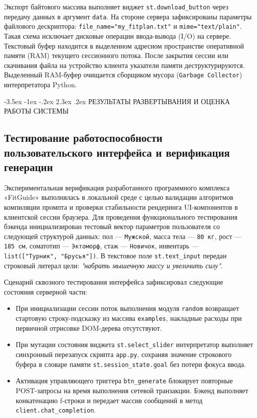 \documentclass[14pt, a4paper]{extarticle}
\makeatletter
\renewcommand\section{\@startsection {section}{1}{\z@}%
                                   {-3.5ex \@plus -1ex \@minus -.2ex}%
                                   {2.3ex \@plus.2ex}%
                                   {\centering\normalfont\Large\bfseries}}
\makeatother
\begin{document}
Экспорт байтового массива выполняет виджет \verb|st.download_button| через передачу данных в аргумент \verb|data|. На стороне сервера зафиксированы параметры файлового дескриптора: \verb|file_name="my_fitplan.txt"| и \verb|mime="text/plain"|. Такая схема исключает дисковые операции ввода-вывода (I/O) на сервере. Текстовый буфер находится в выделенном адресном пространстве оперативной памяти (RAM) \cite{memory_management} текущего сессионного потока. После закрытия сессии или скачивания файла на устройство клиента указатели памяти деструктурируются. Выделенный RAM-буфер очищается сборщиком мусора (\texttt{Garbage Collector}) интерпретатора Python.



\newpage
\section{РЕЗУЛЬТАТЫ РАЗВЕРТЫВАНИЯ И ОЦЕНКА РАБОТЫ СИСТЕМЫ}

\subsection{Тестирование работоспособности пользовательского интерфейса и верификация генерации}

Экспериментальная верификация разработанного программного комплекса «FitGuide» выполнялась в локальной среде с целью валидации алгоритмов компиляции промпта и проверки стабильности рендеринга UI-компонентов в клиентской сессии браузера. Для проведения функционального тестирования бэкенда инициализирован тестовый вектор параметров пользователя со следующей структурой данных: пол --- \texttt{Мужской}, масса тела --- \texttt{80 кг}, рост --- \texttt{185 см}, соматотип --- \texttt{Эктоморф}, стаж --- \texttt{Новичок}, инвентарь --- \texttt{list(["Турник", "Брусья"])}. В текстовое поле \texttt{st.text\_input} передан строковый литерал цели: \textit{"набрать мышечную массу и увеличить силу"}.

Сценарий сквозного тестирования интерфейса зафиксировал следующие состояния серверной части:
\begin{itemize}
    \item При инициализации сессии поток выполнения модуля \texttt{random} возвращает стартовую строку-подсказку из массива \texttt{examples}, накладные расходы при первичной отрисовке DOM-дерева отсутствуют.
    \item При мутации состояния виджета \texttt{st.select\_slider} интерпретатор выполняет синхронный перезапуск скрипта \texttt{app.py}, сохраняя значение строкового буфера в словаре памяти \texttt{st.session\_state.goal} без потери фокуса ввода.
    \item Активация управляющего триггера \texttt{btn\_generate} блокирует повторные POST-запросы на время выполнения сетевой транзакции. Бэкенд выполняет конкатенацию f-строки и передает массив сообщений в метод \texttt{client.chat\_completion}.
\end{itemize}
\end{document}
